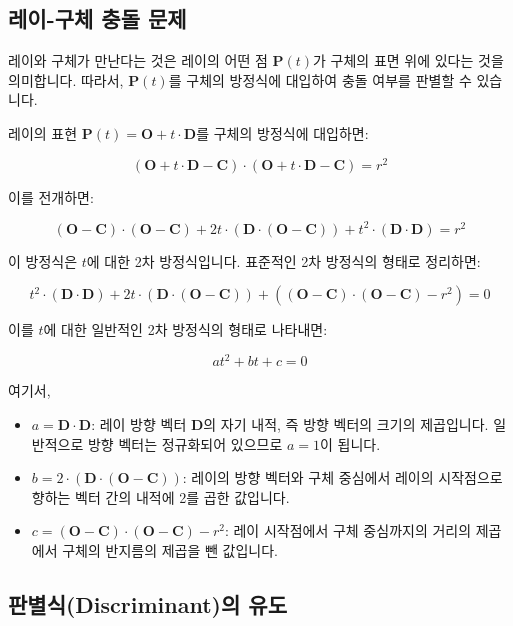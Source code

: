 \documentclass[a4paper, 12pt]{article}
\begin{document}
\subsection{레이-구체 충돌 문제}

레이와 구체가 만난다는 것은 레이의 어떤 점 \(\mathbf{P}(t)\)가 구체의 표면 위에 있다는 것을 의미합니다. 따라서, \(\mathbf{P}(t)\)를 구체의 방정식에 대입하여 충돌 여부를 판별할 수 있습니다.

레이의 표현 \(\mathbf{P}(t) = \mathbf{O} + t \cdot \mathbf{D}\)를 구체의 방정식에 대입하면:

\[
(\mathbf{O} + t \cdot \mathbf{D} - \mathbf{C}) \cdot (\mathbf{O} + t \cdot \mathbf{D} - \mathbf{C}) = r^2
\]

이를 전개하면:

\[
(\mathbf{O} - \mathbf{C}) \cdot (\mathbf{O} - \mathbf{C}) + 2t \cdot (\mathbf{D} \cdot (\mathbf{O} - \mathbf{C})) + t^2 \cdot (\mathbf{D} \cdot \mathbf{D}) = r^2
\]

이 방정식은 \(t\)에 대한 2차 방정식입니다. 표준적인 2차 방정식의 형태로 정리하면:

\[
t^2 \cdot (\mathbf{D} \cdot \mathbf{D}) + 2t \cdot (\mathbf{D} \cdot (\mathbf{O} - \mathbf{C})) + \left((\mathbf{O} - \mathbf{C}) \cdot (\mathbf{O} - \mathbf{C}) - r^2\right) = 0
\]

이를 \(t\)에 대한 일반적인 2차 방정식의 형태로 나타내면:

\[
a t^2 + b t + c = 0
\]

여기서,

\begin{itemize}
    \item \(a = \mathbf{D} \cdot \mathbf{D}\): 레이 방향 벡터 \(\mathbf{D}\)의 자기 내적, 즉 방향 벡터의 크기의 제곱입니다. 일반적으로 방향 벡터는 정규화되어 있으므로 \(a = 1\)이 됩니다.
    \item \(b = 2 \cdot (\mathbf{D} \cdot (\mathbf{O} - \mathbf{C}))\): 레이의 방향 벡터와 구체 중심에서 레이의 시작점으로 향하는 벡터 간의 내적에 2를 곱한 값입니다.
    \item \(c = (\mathbf{O} - \mathbf{C}) \cdot (\mathbf{O} - \mathbf{C}) - r^2\): 레이 시작점에서 구체 중심까지의 거리의 제곱에서 구체의 반지름의 제곱을 뺀 값입니다.
\end{itemize}

\subsection{판별식(Discriminant)의 유도}
\end{document}
